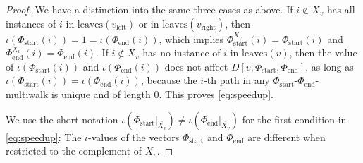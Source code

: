 \documentclass[10pt,a4paper]{article}
\numberwithin{equation}{section}
\theoremstyle{definition}
\begin{document}
\begin{proof}
We have a distinction into the same three cases as above.
If $i \notin X_v$ has all instances of $i$ in $\text{leaves}(v_\text{left})$ or in $\text{leaves}(v_\text{right})$, then
$\iota(\Phi_\text{start}(i))=1=\iota(\Phi_\text{end}(i))$, which implies
$\Phi_\text{start}^{X_v}(i)=\Phi_\text{start}(i)$ and $\Phi_\text{end}^{X_v}(i)=\Phi_\text{end}(i)$.
If $i \notin X_v$ has no instance of $i$ in $\text{leaves}(v)$, then the value of $\iota(\Phi_\text{start}(i))$ and $\iota(\Phi_\text{end}(i))$ does not affect $D[v,\Phi_\text{start},\Phi_\text{end}]$, as long as $\iota(\Phi_\text{start}(i))=\iota(\Phi_\text{end}(i))$, because the $i$-th path in any $\Phi_\text{start}$-$\Phi_\text{end}$-multiwalk is unique and of length 0.
This proves \eqref{eq:speedup}.

We use the short notation $\iota(\Phi_\text{start}|_{\overline{X_v}})\neq\iota(\Phi_\text{end}|_{\overline{X_v}})$ for the first condition in \eqref{eq:speedup}: The $\iota$-values of the vectors $\Phi_\text{start}$ and $\Phi_\text{end}$ are different when restricted to the complement of $X_v$.


\end{proof}
\end{document}
